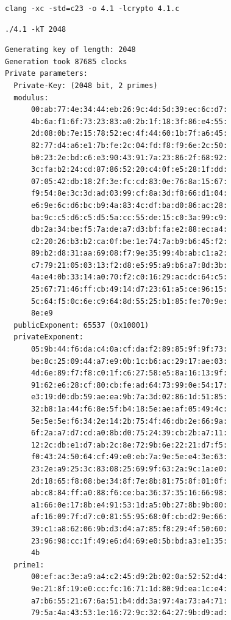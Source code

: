 \documentclass{kpi-lab}
\begin{document}
\inputminted{c}{4.1.c}

\begin{verbatim}
clang -xc -std=c23 -o 4.1 -lcrypto 4.1.c
\end{verbatim}

\begin{verbatim}
./4.1 -kT 2048
\end{verbatim}
\begin{verbatim}
Generating key of length: 2048
Generation took 87685 clocks
Private parameters:
  Private-Key: (2048 bit, 2 primes)
  modulus:
      00:ab:77:4e:34:44:eb:26:9c:4d:5d:39:ec:6c:d7:
      4b:6a:f1:6f:73:23:83:a0:2b:1f:18:3f:86:e4:55:
      2d:08:0b:7e:15:78:52:ec:4f:44:60:1b:7f:a6:45:
      82:77:d4:a6:e1:7b:fe:2c:04:fd:f8:f9:6e:2c:50:
      b0:23:2e:bd:c6:e3:90:43:91:7a:23:86:2f:68:92:
      3c:fa:b2:24:cd:87:86:52:20:c4:0f:e5:28:1f:dd:
      07:05:42:db:18:2f:3e:fc:cd:83:0e:76:8a:15:67:
      f9:54:8e:3c:3d:ad:03:99:cf:8a:3d:f8:66:d1:04:
      e6:9e:6c:d6:bc:b9:4a:83:4c:df:ba:d0:86:ac:28:
      ba:9c:c5:d6:c5:d5:5a:cc:55:de:15:c0:3a:99:c9:
      db:2a:34:be:f5:7a:de:a7:d3:bf:fa:e2:88:ec:a4:
      c2:20:26:b3:b2:ca:0f:be:1e:74:7a:b9:b6:45:f2:
      89:b2:d8:31:aa:69:08:f7:9e:35:99:4b:ab:c1:a2:
      c7:79:21:05:03:13:f2:d8:e5:95:a9:b6:a7:8d:3b:
      4a:e4:0b:33:14:a0:70:f2:c0:16:29:ac:dc:64:c5:
      25:67:71:46:ff:cb:49:14:d7:23:61:a5:ce:96:15:
      5c:64:f5:0c:6e:c9:64:8d:55:25:b1:85:fe:70:9e:
      8e:e9
  publicExponent: 65537 (0x10001)
  privateExponent:
      05:9b:44:f6:da:c4:0a:cf:da:f2:89:85:9f:9f:73:
      be:8c:25:09:44:a7:e9:0b:1c:b6:ac:29:17:ae:03:
      4d:6e:89:f7:f8:c0:1f:c6:27:58:e5:8a:16:13:9f:
      91:62:e6:28:cf:80:cb:fe:ad:64:73:99:0e:54:17:
      e3:19:d0:db:59:ae:ea:9b:7a:3d:02:86:1d:51:85:
      32:b8:1a:44:f6:8e:5f:b4:18:5e:ae:af:05:49:4c:
      5e:5e:5e:f6:34:2e:14:2b:75:4f:46:db:2e:66:9a:
      6f:2a:a7:d7:cd:a0:8b:d0:75:24:39:cb:2b:a7:11:
      12:2c:db:e1:d7:ab:2c:8e:72:9b:6e:22:21:d7:f5:
      f0:43:24:50:64:cf:49:e0:eb:7a:9e:5e:e4:3e:63:
      23:2e:a9:25:3c:83:08:25:69:9f:63:2a:9c:1a:e0:
      2d:18:65:f8:08:be:34:8f:7e:8b:81:75:8f:01:0f:
      ab:c8:84:ff:a0:88:f6:ce:ba:36:37:35:16:66:98:
      a1:66:0e:17:8b:e4:91:53:1d:a5:0b:27:8b:9b:00:
      af:16:09:7f:d7:c0:81:55:95:68:0f:cb:d2:9e:66:
      39:c1:a8:62:06:9b:d3:d4:a7:85:f8:29:4f:50:60:
      23:96:98:cc:1f:49:e6:d4:69:e0:5b:bd:a3:e1:35:
      4b
  prime1:
      00:ef:ac:3e:a9:a4:c2:45:d9:2b:02:0a:52:52:d4:
      9e:21:8f:19:e0:cc:fc:16:71:1d:80:9d:ea:1c:e4:
      a7:b6:55:21:67:6a:51:b4:dd:3a:97:4a:73:a4:71:
      79:5a:4a:43:53:1e:16:72:9c:32:64:27:9b:d9:ad:

\end{verbatim}
\end{document}
